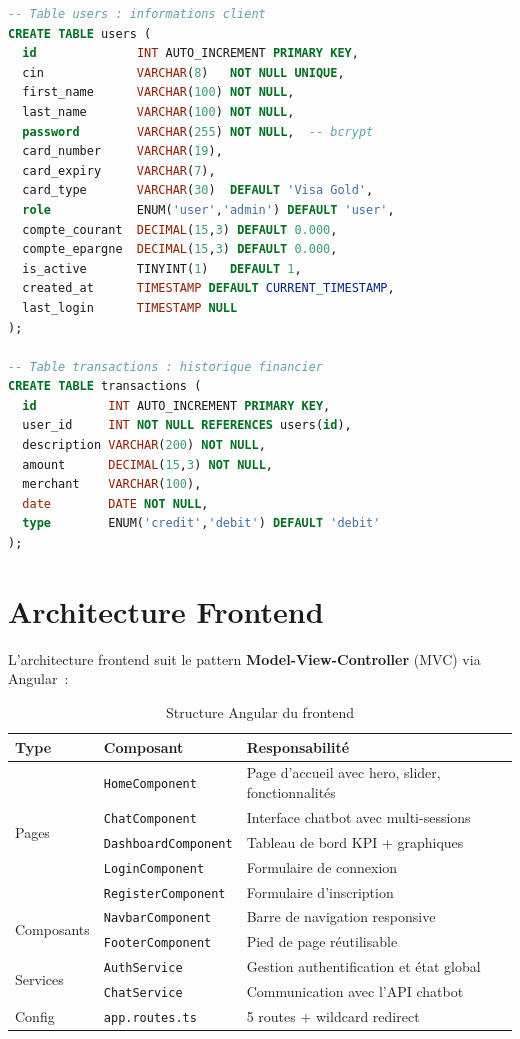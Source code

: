 \documentclass[12pt,a4paper]{report}
\begin{document}
\begin{lstlisting}[language=SQL, caption={Schéma principal de la base de données}]
-- Table users : informations client
CREATE TABLE users (
  id              INT AUTO_INCREMENT PRIMARY KEY,
  cin             VARCHAR(8)   NOT NULL UNIQUE,
  first_name      VARCHAR(100) NOT NULL,
  last_name       VARCHAR(100) NOT NULL,
  password        VARCHAR(255) NOT NULL,  -- bcrypt
  card_number     VARCHAR(19),
  card_expiry     VARCHAR(7),
  card_type       VARCHAR(30)  DEFAULT 'Visa Gold',
  role            ENUM('user','admin') DEFAULT 'user',
  compte_courant  DECIMAL(15,3) DEFAULT 0.000,
  compte_epargne  DECIMAL(15,3) DEFAULT 0.000,
  is_active       TINYINT(1)   DEFAULT 1,
  created_at      TIMESTAMP DEFAULT CURRENT_TIMESTAMP,
  last_login      TIMESTAMP NULL
);

-- Table transactions : historique financier
CREATE TABLE transactions (
  id          INT AUTO_INCREMENT PRIMARY KEY,
  user_id     INT NOT NULL REFERENCES users(id),
  description VARCHAR(200) NOT NULL,
  amount      DECIMAL(15,3) NOT NULL,
  merchant    VARCHAR(100),
  date        DATE NOT NULL,
  type        ENUM('credit','debit') DEFAULT 'debit'
);
\end{lstlisting}

\section{Architecture Frontend}

L'architecture frontend suit le pattern \textbf{Model-View-Controller} (MVC) via Angular~:

\begin{table}[H]
\centering
\caption{Structure Angular du frontend}
\begin{tabularx}{\textwidth}{|l|l|X|}
\hline
\textbf{Type} & \textbf{Composant} & \textbf{Responsabilité} \\
\hline
\multirow{5}{*}{Pages} & \texttt{HomeComponent} & Page d'accueil avec hero, slider, fonctionnalités \\
& \texttt{ChatComponent} & Interface chatbot avec multi-sessions \\
& \texttt{DashboardComponent} & Tableau de bord KPI + graphiques \\
& \texttt{LoginComponent} & Formulaire de connexion \\
& \texttt{RegisterComponent} & Formulaire d'inscription \\
\hline
\multirow{2}{*}{Composants} & \texttt{NavbarComponent} & Barre de navigation responsive \\
& \texttt{FooterComponent} & Pied de page réutilisable \\
\hline
\multirow{2}{*}{Services} & \texttt{AuthService} & Gestion authentification et état global \\
& \texttt{ChatService} & Communication avec l'API chatbot \\
\hline
Config & \texttt{app.routes.ts} & 5 routes + wildcard redirect \\
\hline
\end{tabularx}
\end{table}
\end{document}
